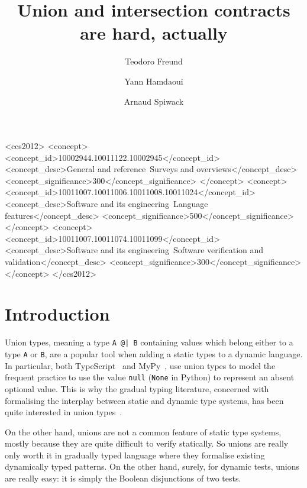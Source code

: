 \documentclass[sigplan,10pt,review,anonymous]{acmart}
\title{Union and intersection contracts are hard, actually}
\author{Teodoro Freund}
\affiliation{
  \institution{Universidad de Buenos Aires}
  \city{Buenos Aires}
  \country{Argentina}
}
\author{Yann Hamdaoui}
\affiliation{
  \institution{Tweag}
  \city{Paris}
  \country{France}
}
\author{Arnaud Spiwack}
\affiliation{
  \institution{Tweag}
  \city{Paris}
  \country{France}
}
\newcommand{\nickel}[1]{\lstinline[language=nickel]{#1}}
\begin{document}
\begin{CCSXML}
<ccs2012>
   <concept>
       <concept_id>10002944.10011122.10002945</concept_id>
       <concept_desc>General and reference~Surveys and overviews</concept_desc>
       <concept_significance>300</concept_significance>
       </concept>
   <concept>
       <concept_id>10011007.10011006.10011008.10011024</concept_id>
       <concept_desc>Software and its engineering~Language features</concept_desc>
       <concept_significance>500</concept_significance>
       </concept>
   <concept>
       <concept_id>10011007.10011074.10011099</concept_id>
       <concept_desc>Software and its engineering~Software verification and validation</concept_desc>
       <concept_significance>300</concept_significance>
       </concept>
 </ccs2012>
\end{CCSXML}



\maketitle

\section{Introduction}
\label{sec:intro}

Union types, meaning a type \nickel{A @| B} containing values which
belong either to a type \nickel{A} or \nickel{B}, are a popular tool
when adding a static types to a dynamic language. In particular, both
TypeScript~\cite{TypeScriptUnions} and MyPy~\cite{MyPyOptional}, use
union types to model the frequent practice to use the value
\lstinline{null} (\lstinline{None} in Python) to represent an absent
optional value. This is why the gradual typing literature, concerned
with formalising the interplay between static and dynamic type
systems, has been quite interested in union
types~\cite{RootCauseOfBlame,KeilThiemannUnionIntersection}.

On the other hand, unions are not a common feature of static type
systems, mostly because they are quite difficult to verify
statically. So unions are really only worth it in gradually typed
language where they formalise existing dynamically typed patterns. On
the other hand, surely, for dynamic tests, unions are really easy: it
is simply the Boolean disjunctions of two tests.
\end{document}
